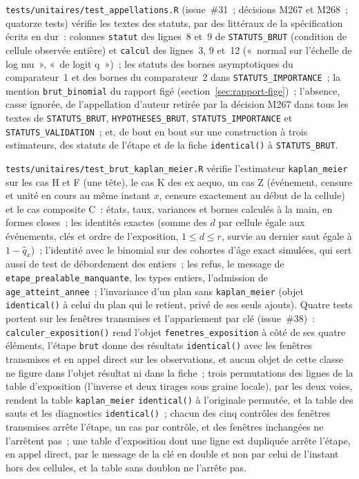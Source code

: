 \documentclass[a4paper,11pt]{article}
\newcommand{\code}[1]{\texttt{\small #1}}
\begin{document}
\medskip
\code{tests/unitaires/test\_appellations.R} (issue~\#31~; décisions M267 et
M268~; quatorze tests) vérifie les textes des statuts, par des littéraux de
la spécification écrits en dur~: colonnes \code{statut} des lignes~8 et~9
de \code{STATUTS\_BRUT} (condition de cellule observée entière) et
\code{calcul} des lignes~3, 9 et~12 («~normal sur l'échelle de log mu~»,
«~de logit q~»)~; les statuts des bornes asymptotiques du comparateur~1
et des bornes du comparateur~2 dans \code{STATUTS\_IMPORTANCE}~; la mention \code{brut\_binomial} du rapport
figé (section~\ref{sec:rapport-fige})~; l'absence, casse ignorée, de
l'appellation d'auteur retirée par la décision M267 dans tous les textes de
\code{STATUTS\_BRUT}, \code{HYPOTHESES\_BRUT}, \code{STATUTS\_IMPORTANCE} et
\code{STATUTS\_VALIDATION}~; et, de bout en bout sur une construction à
trois estimateurs, des statuts de l'étape et de la fiche \code{identical()}
à \code{STATUTS\_BRUT}.

\medskip
\code{tests/unitaires/test\_brut\_kaplan\_meier.R} vérifie l'estimateur
\code{kaplan\_meier} sur les cas H et F (une tête), le cas K des ex aequo, un
cas Z (événement, censure et unité en cours au même instant $x$, censure
exactement au début de la cellule) et le cas composite C~: états, taux,
variances et bornes calculés à la main, en formes closes~; les identités
exactes (somme des $d$ par cellule égale aux événements, clés et ordre de
l'exposition, $1 \le d \le r$, survie au dernier saut égale à $1 - \hat q_x$)~;
l'identité avec le binomial sur des cohortes d'âge exact simulées, qui sert
aussi de test de débordement des entiers~; les refus, le message de
\code{etape\_prealable\_manquante}, les types entiers, l'admission de
\code{age\_atteint\_annee}~; l'invariance d'un plan sans \code{kaplan\_meier}
(objet \code{identical()} à celui du plan qui le retient, privé de ses seuls
ajouts). Quatre tests portent sur les fenêtres transmises et l'appariement
par clé (issue~\#38)~:
\code{calculer\_exposition()} rend l'objet \code{fenetres\_exposition} à
côté de ses quatre éléments, l'étape \code{brut} donne des résultats
\code{identical()} avec les fenêtres transmises et en appel direct sur les
observations, et aucun objet de cette classe ne figure dans l'objet résultat
ni dans la fiche~; trois permutations des lignes de la table d'exposition
(l'inverse et deux tirages sous graine locale), par les deux voies, rendent
la table \code{kaplan\_meier} \code{identical()} à l'originale permutée, et
la table des sauts et les diagnostics \code{identical()}~; chacun des cinq
contrôles des fenêtres transmises arrête l'étape, un cas par contrôle, et
des fenêtres inchangées ne l'arrêtent pas~; une table d'exposition dont une
ligne est dupliquée arrête l'étape, en appel direct, par le message de la clé
en double et non par celui de l'instant hors des cellules, et la table sans
doublon ne l'arrête pas.
\end{document}
